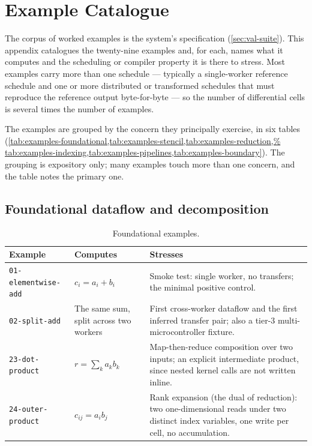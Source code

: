 \chapter{Example Catalogue}\label{app:examples}

The corpus of worked examples is the system's specification (\cref{sec:val-suite}).
This appendix catalogues the twenty-nine examples and, for each, names what it
computes and the scheduling or compiler property it is there to stress. Most examples carry more than one schedule --- typically a single-worker
reference schedule and one or more distributed or transformed schedules that must
reproduce the reference output byte-for-byte --- so the number of differential cells
is several times the number of examples.

The examples are grouped by the concern they principally exercise, in six tables
(\cref{tab:examples-foundational,tab:examples-stencil,tab:examples-reduction,%
tab:examples-indexing,tab:examples-pipelines,tab:examples-boundary}). The grouping is
expository only; many examples touch more than one concern, and the table notes the
primary one.

\section{Foundational dataflow and decomposition}

\begin{table}[htbp]
  \centering
  \small
  \begin{tabular}{@{}p{}p{}p{}@{}}
    \toprule
    Example & Computes & Stresses \\
    \midrule
    \texttt{01-elementwise-add} & $c_i = a_i + b_i$ & Smoke test: single worker, no
      transfers; the minimal positive control. \\
    \texttt{02-split-add} & The same sum, split across two workers & First
      cross-worker dataflow and the first inferred transfer pair; also a tier-3
      multi-microcontroller fixture. \\
    \texttt{23-dot-product} & $r = \sum_k a_k b_k$ & Map-then-reduce composition over
      two inputs; an explicit intermediate product, since nested kernel calls are not
      written inline. \\
    \texttt{24-outer-product} & $c_{ij} = a_i b_j$ & Rank expansion (the dual of
      reduction): two one-dimensional reads under two distinct index variables, one
      write per cell, no accumulation. \\
    \bottomrule
  \end{tabular}
  \caption{Foundational examples.}
  \label{tab:examples-foundational}
\end{table}

